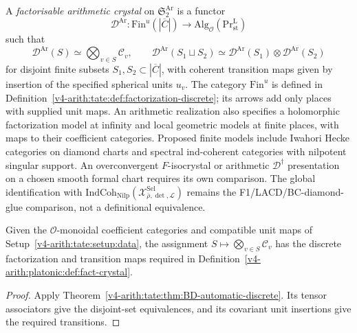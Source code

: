\begin{definition}
\label{v4-arith:platonic:def:fact-crystal}
A \emph{factorisable arithmetic
crystal} on \(\mathfrak{S}^{\mathrm{Ar}}_{2}\) is a functor
\begin{equation}
\label{v4-arith:platonic:eq:fact-crystal}
\mathscr{D}^{\mathrm{Ar}}\colon
\mathrm{Fin}^{u}(|\overline{C}|)
\longrightarrow
\mathrm{Alg}_{\mathcal{O}}(\mathrm{Pr}^{\mathrm{L}}_{\mathrm{st}})
\end{equation}
such that
\[
\mathscr{D}^{\mathrm{Ar}}(S)\simeq\bigotimes_{v\in S}\mathcal{C}_{v},
\qquad
\mathscr{D}^{\mathrm{Ar}}(S_{1}\sqcup S_{2})
\simeq
\mathscr{D}^{\mathrm{Ar}}(S_{1})\otimes
\mathscr{D}^{\mathrm{Ar}}(S_{2})
\]
for disjoint finite subsets \(S_{1},S_{2}\subset|\overline{C}|\),
with coherent transition maps given by insertion of the specified
spherical units \(u_v\). The category \(\mathrm{Fin}^{u}\) is
defined in Definition~\ref{v4-arith:tate:def:factorization-discrete}; its
arrows add only places with supplied unit maps. An arithmetic
realization also specifies a holomorphic factorization model at
infinity and local geometric models at finite places, with maps
to their coefficient categories. Proposed finite models include
Iwahori Hecke categories on diamond charts and spectral
ind-coherent categories with nilpotent singular support.
An overconvergent \(F\)-isocrystal or arithmetic
\(\mathcal D^{\dagger}\) presentation on a chosen smooth formal
chart requires its own comparison. The global identification with
\(\mathrm{IndCoh}_{\mathrm{Nilp}}(\mathcal{X}^{\mathrm{Sel}}_{\bar\rho,\det,\mathcal{L}})\)
remains the F1/LACD/BC-diamond-glue comparison, not a definitional
equivalence.
\end{definition}

\begin{proposition}
\label{v4-arith:platonic:prop:Dmodule-upgrade}
Given the \(\mathcal O\)-monoidal coefficient categories and
compatible unit maps of Setup~\ref{v4-arith:tate:setup:data},
the assignment \(S\mapsto\bigotimes_{v\in S}\mathcal C_v\)
has the discrete factorization and transition maps required in
Definition~\ref{v4-arith:platonic:def:fact-crystal}.
\end{proposition}

\begin{proof}
Apply Theorem~\ref{v4-arith:tate:thm:BD-automatic-discrete}.
Its tensor associators give the disjoint-set equivalences, and
its covariant unit insertions give the required transitions.
\end{proof}

